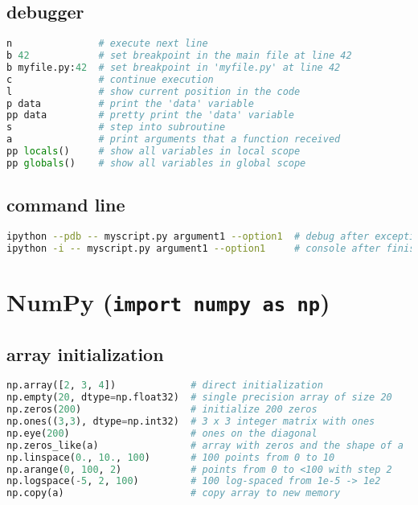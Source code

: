 \subsection{debugger}\label{debugger}

\begin{lstlisting}[language=Python]
n               # execute next line
b 42            # set breakpoint in the main file at line 42
b myfile.py:42  # set breakpoint in 'myfile.py' at line 42
c               # continue execution
l               # show current position in the code
p data          # print the 'data' variable
pp data         # pretty print the 'data' variable
s               # step into subroutine
a               # print arguments that a function received
pp locals()     # show all variables in local scope
pp globals()    # show all variables in global scope
\end{lstlisting}

\subsection{command line}\label{command-line}

\begin{lstlisting}[language=bash]
ipython --pdb -- myscript.py argument1 --option1  # debug after exception
ipython -i -- myscript.py argument1 --option1     # console after finish
\end{lstlisting}

\section{\texorpdfstring{NumPy
(\texttt{import\ numpy\ as\ np})}{NumPy (import numpy as np)}}\label{numpy-import-numpy-as-np}

\subsection{array initialization}\label{array-initialization}

\begin{lstlisting}[language=Python]
np.array([2, 3, 4])             # direct initialization
np.empty(20, dtype=np.float32)  # single precision array of size 20
np.zeros(200)                   # initialize 200 zeros
np.ones((3,3), dtype=np.int32)  # 3 x 3 integer matrix with ones
np.eye(200)                     # ones on the diagonal
np.zeros_like(a)                # array with zeros and the shape of a
np.linspace(0., 10., 100)       # 100 points from 0 to 10
np.arange(0, 100, 2)            # points from 0 to <100 with step 2
np.logspace(-5, 2, 100)         # 100 log-spaced from 1e-5 -> 1e2
np.copy(a)                      # copy array to new memory
\end{lstlisting}

